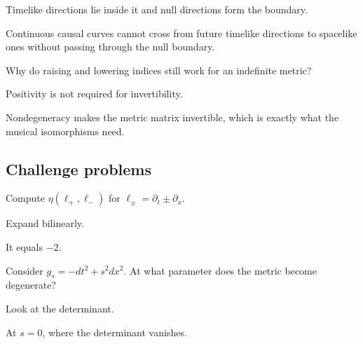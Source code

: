 \begin{hint}
Timelike directions lie inside it and null directions form the boundary.
\end{hint}

\begin{solution}
Continuous causal curves cannot cross from future timelike directions to spacelike ones without passing through the null boundary.
\end{solution}

\begin{exercise}\label{exr:vii29-ped-14}
Why do raising and lowering indices still work for an indefinite metric?
\end{exercise}

\begin{hint}
Positivity is not required for invertibility.
\end{hint}

\begin{solution}
Nondegeneracy makes the metric matrix invertible, which is exactly what the musical isomorphisms need.
\end{solution}

\subsection*{Challenge problems}

\begin{exercise}\label{exr:vii29-ped-15}
Compute \(\eta(\ell_+,\ell_-)\) for \(\ell_\pm=\partial_t\pm\partial_x\).
\end{exercise}

\begin{hint}
Expand bilinearly.
\end{hint}

\begin{solution}
It equals \(-2\).
\end{solution}

\begin{exercise}\label{exr:vii29-ped-16}
Consider \(g_s=-dt^2+s^2dx^2\).  At what parameter does the metric become degenerate?
\end{exercise}

\begin{hint}
Look at the determinant.
\end{hint}

\begin{solution}
At \(s=0\), where the determinant vanishes.
\end{solution}

